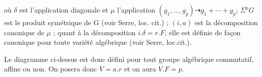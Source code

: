 
où $\delta$ est l'application diagonale et $\mu$ l'application $(g_1,\ldots,g_p)\dashrightarrow g_1+\cdots+g_p$; $\Sigma^pG$ est le produit symétrique de G (voir Serre, loc. cit.) ; $(i,a)$ est la décomposition canonique de $\mu$ ; quant à la décomposition $i.\delta=r.F$, elle est définie de façon canonique pour toute variété algébrique (voir Serre, loc.cit.).

Le diagramme ci-dessus est donc défini pour tout groupe algébrique commutatif, affine ou non. On posera donc $V=a.r$ et on aura $V.F=p$.

